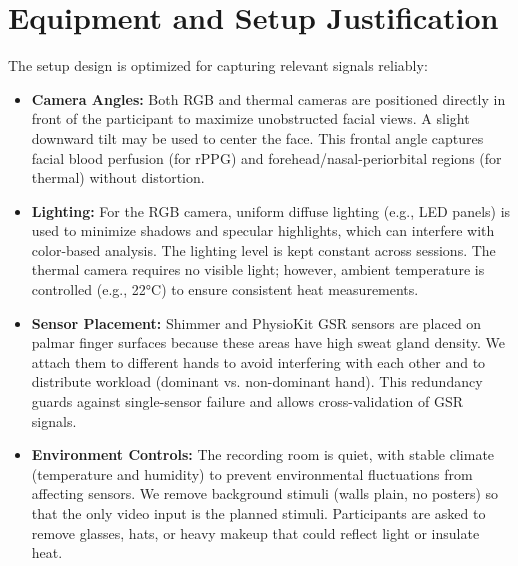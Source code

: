 \section{Equipment and Setup Justification}
The setup design is optimized for capturing relevant signals reliably:
\begin{itemize}
    \item \textbf{Camera Angles:} Both RGB and thermal cameras are positioned directly in front of the participant to maximize unobstructed facial views. A slight downward tilt may be used to center the face. This frontal angle captures facial blood perfusion (for rPPG) and forehead/nasal-periorbital regions (for thermal) without distortion.
    \item \textbf{Lighting:} For the RGB camera, uniform diffuse lighting (e.g., LED panels) is used to minimize shadows and specular highlights, which can interfere with color-based analysis. The lighting level is kept constant across sessions. The thermal camera requires no visible light; however, ambient temperature is controlled (e.g., 22°C) to ensure consistent heat measurements.
    \item \textbf{Sensor Placement:} Shimmer and PhysioKit GSR sensors are placed on palmar finger surfaces because these areas have high sweat gland density. We attach them to different hands to avoid interfering with each other and to distribute workload (dominant vs. non-dominant hand). This redundancy guards against single-sensor failure and allows cross-validation of GSR signals.
    \item \textbf{Environment Controls:} The recording room is quiet, with stable climate (temperature and humidity) to prevent environmental fluctuations from affecting sensors. We remove background stimuli (walls plain, no posters) so that the only video input is the planned stimuli. Participants are asked to remove glasses, hats, or heavy makeup that could reflect light or insulate heat.
\end{itemize}


